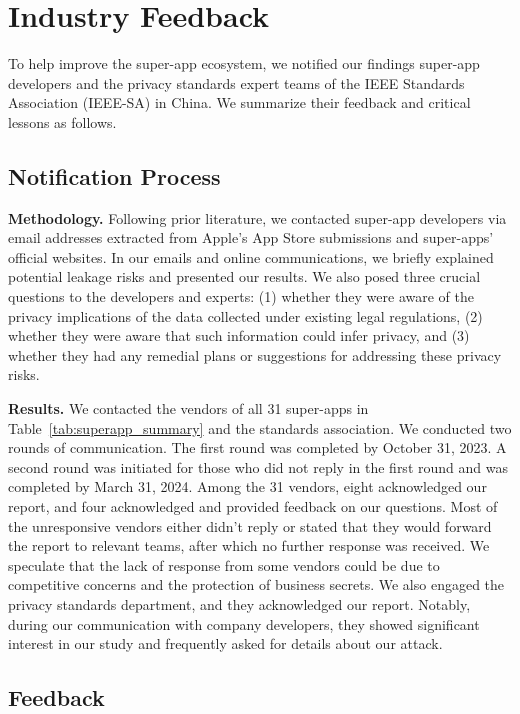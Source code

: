 
\section{Industry Feedback}

To help improve the super-app ecosystem, we notified our findings super-app developers and the
privacy standards expert teams of the IEEE Standards
Association (IEEE-SA) in China. We summarize their feedback and critical lessons as follows.


\subsection{Notification Process}

\textbf{Methodology.}
Following prior literature, we contacted super-app developers via email addresses extracted from Apple's App Store submissions and super-apps' official websites. In our emails and
online communications, we briefly explained potential leakage risks and
presented our results. We also posed three crucial questions to
the developers and experts: 
(1) whether they were aware of the privacy implications of the data collected under existing legal regulations,
(2) whether they were aware that such information could infer privacy,
and (3) whether they had any remedial plans or suggestions for addressing these privacy risks.


\noindent \textbf{Results.}
We contacted the vendors of all 31 super-apps in Table~\ref{tab:superapp_summary}
and the standards association. We conducted two rounds of
communication. The first round was completed by October 31, 2023.
A second round was initiated for those who did not reply in the first round and was completed by March 31, 2024. Among the 31 vendors, eight acknowledged our report, and four acknowledged and provided feedback on our
questions. 
Most of the unresponsive vendors either didn't reply or
stated that they would forward the report to relevant teams, after which no
further response was received. We speculate that the lack of response from some
vendors could be due to competitive concerns and the protection of business
secrets.
% 
We also engaged the privacy standards department, and they acknowledged our report. Notably, during our communication with company developers, they showed significant interest in our study and frequently asked for details about our attack.


\subsection{Feedback}

